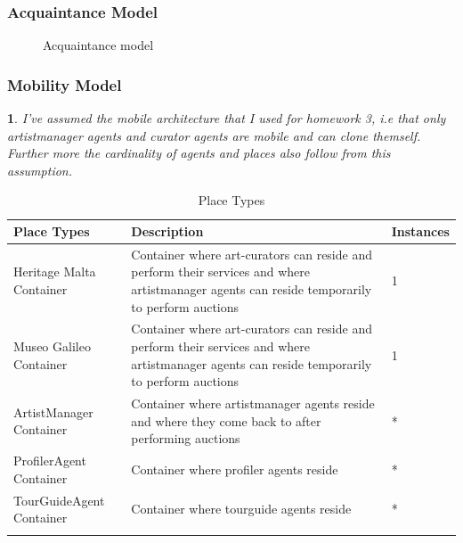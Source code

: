 \documentclass[paper=letter, fontsize=12pt]{article}
\makeatletter
\newtheorem*{assumption*}{\assumptionnumber}
\providecommand{\assumptionnumber}{}
\newenvironment{assumption}[2]
 {%
  \renewcommand{\assumptionnumber}{Assumption #1-$\mathcal{#2}$}%
  \begin{assumption*}%
  \protected@edef\@currentlabel{#1-$\mathcal{#2}$}%
 }
 {%
  \end{assumption*}
 }
\makeatother
\begin{document}
\subsubsection{Acquaintance Model}
\begin{figure}[H]
  \begin{center}
    \caption{Acquaintance model}
    \label{fig:acquaintance_model}
  \end{center}
\end{figure}

\subsubsection{Mobility Model}
\begin{assumption}{2}{A}\label{2A}
I've assumed the mobile architecture that I used for homework 3, i.e that only artistmanager agents and curator agents are mobile and can clone themself. Further more the cardinality of agents and places also follow from this assumption.
\end{assumption}
\begin {table}[H]
\caption {Place Types} \label{tab:placeTypes} 
\begin{center}
    \begin{tabular}{  p{4cm}  p{4cm}  p{4cm} }
\Xhline{4\arrayrulewidth}
    Place Types & Description & Instances \\ \hline
Heritage Malta Container & Container where art-curators can reside and perform their services and where artistmanager agents can reside temporarily to perform auctions & 1 \\
Museo Galileo Container & Container where art-curators can reside and perform their services and where artistmanager agents can reside temporarily to perform auctions & 1 \\
ArtistManager Container & Container where artistmanager agents reside and where they come back to after performing auctions & * \\
ProfilerAgent Container & Container where profiler agents reside  & * \\ 
TourGuideAgent Container & Container where tourguide agents reside  & * \\ 
\Xhline{4\arrayrulewidth}
    \end{tabular}
\end{center}
\end{table}
\end{document}
